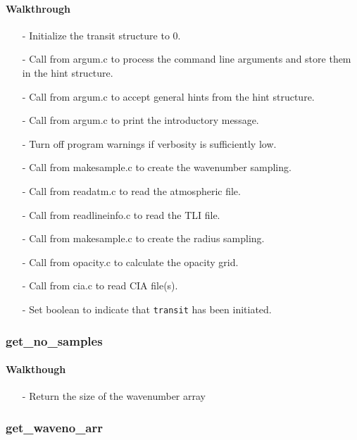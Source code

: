 \documentclass[letterpaper,12pt]{article}
\begin{document}
\paragraph{Walkthrough}
\begin{enumerate}[leftmargin=10pt, noitemsep, parsep=0pt, topsep=0ex]
\item[-] Initialize the transit structure to 0.
\item[-] Call  from argum.c to process the command line arguments and store them in the hint structure.
\item[-] Call  from argum.c to accept general hints from the hint structure.
\item[-] Call  from argum.c to print the introductory message.
\item[-] Turn off program warnings if verbosity is sufficiently low.
\item[-] Call  from makesample.c to create the wavenumber sampling.
\item[-] Call  from readatm.c to read the atmospheric file.
\item[-] Call  from readlineinfo.c to read the TLI file.
\item[-] Call  from makesample.c to create the radius sampling.
\item[-] Call  from opacity.c to calculate the opacity grid.
\item[-] Call  from cia.c to read CIA file(s).
\item[-] Set boolean to indicate that {\tt transit} has been initiated.
\end{enumerate}

\subsubsection{get\_no\_samples}
\paragraph{Walkthough}
\begin{enumerate}[leftmargin=10pt, noitemsep, parsep=0pt, topsep=0ex]
\item[-] Return the size of the wavenumber array
\end{enumerate}

\subsubsection{get\_waveno\_arr}
\end{document}
